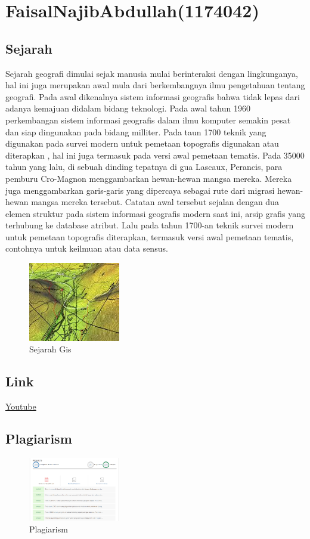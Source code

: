 \section{FaisalNajibAbdullah(1174042)}

\subsection{Sejarah}
Sejarah geografi dimulai sejak manusia mulai berinteraksi dengan lingkunganya, hal ini juga merupakan awal mula dari berkembangnya ilmu pengetahuan tentang geografi.
Pada awal dikenalnya sistem informasi geografis bahwa tidak lepas dari adanya kemajuan didalam bidang teknologi. Pada awal tahun 1960 perkembangan sistem informasi geografis dalam ilmu komputer semakin pesat dan siap dingunakan pada bidang milliter. Pada taun 1700 teknik yang digunakan pada survei modern untuk pemetaan topografis digunakan atau diterapkan , hal ini juga termasuk pada versi awal pemetaan tematis.
Pada 35000 tahun yang lalu, di sebuah dinding tepatnya di gua Lascaux, Perancis, para pemburu Cro-Magnon menggambarkan hewan-hewan mangsa mereka. Mereka juga menggambarkan garis-garis yang dipercaya sebagai rute dari migrasi hewan-hewan mangsa mereka tersebut. Catatan awal tersebut sejalan dengan dua elemen struktur pada sistem informasi geografis modern saat ini, arsip grafis yang terhubung ke database atribut. 
Lalu pada tahun 1700-an teknik survei modern untuk pemetaan topografis diterapkan, termasuk versi awal pemetaan tematis, contohnya untuk keilmuan atau data sensus. 
\begin{figure}[H]
	\includegraphics[width=4cm]{figures/1174042/gis.jpg}
	\centering
	\caption{Sejarah Gis}
\end{figure}

\subsection{Link}
\href{https://www.youtube.com/watch?v=8gTLBneTUAo&t=15s}{Youtube}
\subsection{Plagiarism}
\begin{figure}[H]
	\includegraphics[width=4cm]{figures/1174042/plagiat.png}
	\centering
	\caption{Plagiarism}
\end{figure}